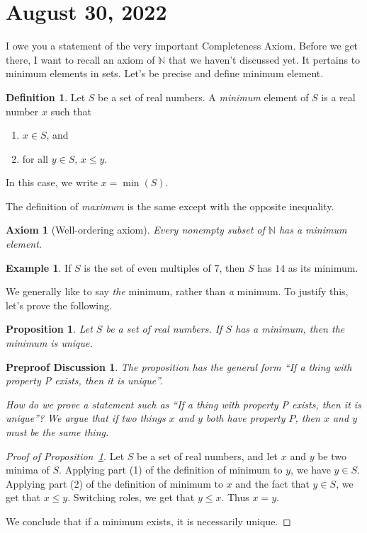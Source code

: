 \documentclass[12pt]{amsart}
\newcommand{\N}{\mathbb{N}}
\numberwithin{equation}{section}
\theoremstyle{plain} %
\newtheorem{preproof}{Preproof Discussion}
\newtheorem{prop}[equation]{Proposition}
\newtheorem{axiom}[equation]{Axiom}
\newcommand{\Aug}[1]{\section{August #1, 2022}}
\theoremstyle{definition}
\newtheorem{defn}[equation]{Definition}
\newtheorem{ex}[equation]{Example}
\theoremstyle{remark}
\begin{document}



\Aug{30}

I owe you a statement of the very important Completeness Axiom. Before we get there, I want to recall an axiom of $\N$ that we haven't discussed yet. It pertains to minimum elements in sets. Let's be precise and define minimum element.

\begin{defn} Let $S$ be a set of real numbers. A \emph{minimum} element of $S$ is a real number $x$ such that
\begin{enumerate}\item $x\in S$, and
\item for all $y\in S$, $x\leq y$.
\end{enumerate}
In this case, we write $x=\min(S)$.
\end{defn}
The definition of \emph{maximum} is the same except with the opposite inequality.

\begin{axiom}[Well-ordering axiom]\label{Well-ordering axiom}
	Every nonempty subset of $\N$ has a minimum element.
\end{axiom}

\begin{ex} If $S$ is the set of even multiples of $7$, then $S$ has $14$ as its minimum.
\end{ex}

We generally like to say \emph{the} minimum, rather than \emph{a} minimum. To justify this, let's prove the following.

\begin{prop}\label{prop:min-unique} Let $S$ be a set of real numbers. If $S$ has a minimum, then the minimum is unique.
\end{prop}


\begin{preproof} The proposition has the general form  ``If a thing with property P exists, then it is unique''. 
	
  How do we prove a statement such as
  ``If a thing with property P exists, then it is unique''?
  We argue that if two things $x$ and $y$ both have property $P$, then $x$ and $y$ must be the same thing.
\end{preproof}

\begin{proof}[Proof of Proposition~\ref{prop:min-unique}] Let $S$ be a set of real numbers, and let $x$ and $y$ be two minima of $S$. Applying part (1) of the definition of minimum to $y$, we have $y\in S$. Applying part (2) of the definition of minimum to $x$ and the fact that $y\in S$, we get that $x\leq y$. Switching roles, we get that $y\leq x$. Thus $x=y$.

We conclude that if a minimum exists, it is necessarily unique.
\end{proof}
\end{document}
